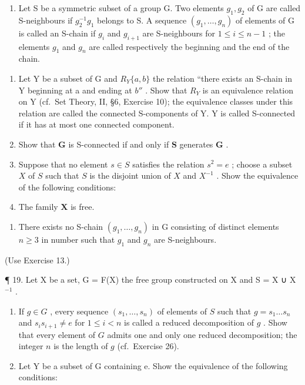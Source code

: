 \begin{enumerate}
\def\labelenumi{\arabic{enumi}.}
\setcounter{enumi}{17}
\tightlist
\item
  Let S be a symmetric subset of a group G. Two elements \(g_{1}, g_{2}\) of G are called S-neighbours if \(g_{2}^{-1}g_{1}\) belongs to S. A sequence \((g_{1}, \ldots, g_{n})\) of elements of G is called an S-chain if \(g_{i}\) and \(g_{i+1}\) are S-neighbours for \(1 \leqslant i \leqslant n - 1\) ; the elements \(g_{1}\) and \(g_{n}\) are called respectively the beginning and the end of the chain.
\end{enumerate}

\begin{enumerate}
\def\labelenumi{(\alph{enumi})}
\item
  Let Y be a subset of G and \(R_{Y}\{a, b\}\) the relation ``there exists an S-chain in Y beginning at a and ending at \(b''\) . Show that \(R_{Y}\) is an equivalence relation on Y (cf.~Set Theory, II, §6, Exercise 10); the equivalence classes under this relation are called the connected S-components of Y. Y is called S-connected if it has at most one connected component.
\item
  Show that \(\mathbf{G}\) is S-connected if and only if \(\mathbf{S}\) generates \(\mathbf{G}\) .
\item
  Suppose that no element \(s \in S\) satisfies the relation \(s^2 = e\) ; choose a subset \(X\) of \(S\) such that \(S\) is the disjoint union of \(X\) and \(X^{-1}\) . Show the equivalence of the following conditions:
\item
  The family \(\mathbf{X}\) is free.
\end{enumerate}

\begin{enumerate}
\def\labelenumi{(\roman{enumi})}
\setcounter{enumi}{1}
\tightlist
\item
  There exists no S-chain \((g_{1},\ldots ,g_{n})\) in G consisting of distinct elements \(n\geqslant 3\) in number such that \(g_{1}\) and \(g_{n}\) are S-neighbours.
\end{enumerate}

(Use Exercise 13.)

¶ 19. Let X be a set, G = F(X) the free group constructed on X and S = X ∪ X \(^{-1}\) .

\begin{enumerate}
\def\labelenumi{(\alph{enumi})}
\item
  If \(g \in G\) , every sequence \((s_1, \ldots, s_n)\) of elements of \(S\) such that \(g = s_1 \ldots s_n\) and \(s_i s_{i+1} \neq e\) for \(1 \leqslant i < n\) is called a reduced decomposition of \(g\) . Show that every element of \(G\) admits one and only one reduced decomposition; the integer \(n\) is the length of \(g\) (cf.~Exercise 26).
\item
  Let Y be a subset of G containing e. Show the equivalence of the following conditions:
\end{enumerate}

